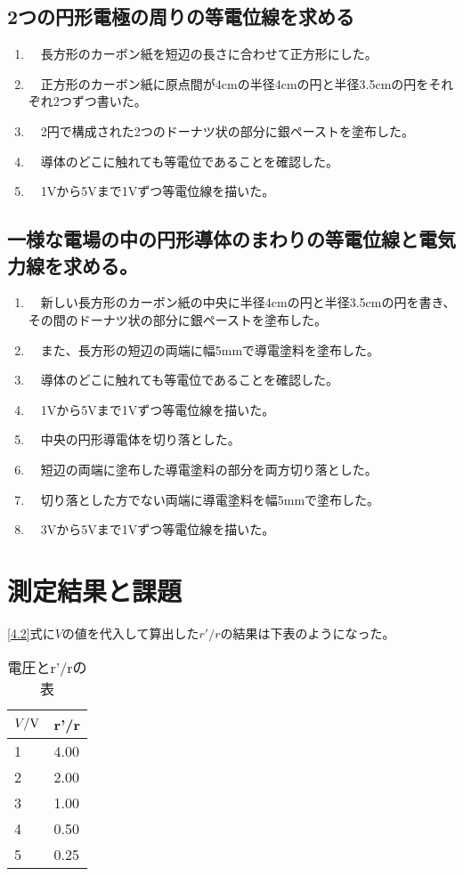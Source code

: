 \documentclass{jsarticle}
\begin{document}
\subsection{2つの円形電極の周りの等電位線を求める}
\begin{enumerate}
	\item　長方形のカーボン紙を短辺の長さに合わせて正方形にした。
	\item　正方形のカーボン紙に原点間が4cmの半径4cmの円と半径3.5cmの円をそれぞれ2つずつ書いた。
	\item　2円で構成された2つのドーナツ状の部分に銀ペーストを塗布した。
	\item　導体のどこに触れても等電位であることを確認した。
	\item　1Vから5Vまで1Vずつ等電位線を描いた。

\end{enumerate}

\subsection{一様な電場の中の円形導体のまわりの等電位線と電気力線を求める。}
\begin{enumerate}
	\item　新しい長方形のカーボン紙の中央に半径4cmの円と半径3.5cmの円を書き、その間のドーナツ状の部分に銀ペーストを塗布した。
	\item　また、長方形の短辺の両端に幅5mmで導電塗料を塗布した。
	\item　導体のどこに触れても等電位であることを確認した。	\item　1Vから5Vまで1Vずつ等電位線を描いた。
	\item　中央の円形導電体を切り落とした。
	\item　短辺の両端に塗布した導電塗料の部分を両方切り落とした。
	\item　切り落とした方でない両端に導電塗料を幅5mmで塗布した。
	\item　3Vから5Vまで1Vずつ等電位線を描いた。
\end{enumerate}

\section{測定結果と課題}

\ref{4.2}式に$V$の値を代入して算出した$r'/r$の結果は下表のようになった。

\begin{table}[H]
	\centering
	\caption{電圧とr'/rの表}
	\label{my-label}
	\begin{tabular}{|l|l|}
	\hline
	$V/\textrm V$ & r'/r \\ \hline
	1   & 4.00 \\ \hline
	2   & 2.00 \\ \hline
	3   & 1.00 \\ \hline
	4   & 0.50 \\ \hline
	5   & 0.25 \\ \hline
	\end{tabular}
	\end{table}
\end{document}
